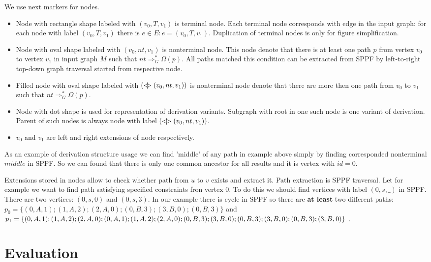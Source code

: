 \documentclass{sig-alternate} %
\begin{document}
We use next markers for nodes.
\begin{itemize}
    \item Node with rectangle shape labeled with $(v_0, T, v_1)$ is terminal node. 
    Each terminal node corresponds with edge in the input graph: for each node with label $(v_0, T, v_1)$ there is $e\in E: e=(v_0,T,v_1)$.
    Duplication of terminal nodes is only for figure simplification.
    \item Node with oval shape labeled with $(v_0, nt, v_1)$ is nonterminal node. 
    This node denote that there is at least one path $p$ from vertex $v_0$ to vertex $v_1$ in input graph $M$ such that $nt \Rightarrow^*_G \Omega(p)$.
    All paths matched this condition can be extracted from SPPF by left-to-right top-down graph traversal started from respective node. 
    \item Filled node with oval shape labeled with $(<\mkern-11mu | \mkern-11mu> (v_0, nt, v_1))$ is nonterminal node denote that there are more then one path from $v_0$ to $v_1$ such that $nt \Rightarrow^*_G \Omega(p)$.
    \item Node with dot shape is used for representation of derivation variants.
    Subgraph with root in one such node is one variant of derivation.
    Parent of such nodes is always node with label $(<\mkern-9mu | \mkern-9mu> (v_0, nt, v_1))$.
    \item $v_0$ and $v_1$ are left and right extensions of node respectively.
\end{itemize}

As an example of derivation structure usage we can find 'middle' of any path in example above simply by finding corresponded nonterminal $middle$ in SPPF.
So we can found that there is only one common ancestor for all results and it is vertex with $id = 0$. 

Extensions stored in nodes allow to check whether path from $u$ to $v$ exists and extract it. 
Path extraction is SPPF traversal. 
Let for example we want to find path satisfying specified constraints fron vertex $0$.
To do this we should find vertices with label $(0, s, \_)$ in SPPF. There are two vertices: $(0, s, 0)$ and $(0, s , 3)$.
In our example there is cycle in SPPF so there are \textbf{at least} two different paths: $p_0=\{(0,A,1);(1,A,2);(2,A,0);(0,B,3);(3,B,0);(0,B,3)\}$ and $p_1=\{(0,A,1);(1,A,2);(2,A,0);(0,A,1);(1,A,2);(2,A,0);\\ (0,B,3);(3,B,0);(0,B,3);(3,B,0);(0,B,3);(3,B,0)\}$ .

\section{Evaluation}
\end{document}
